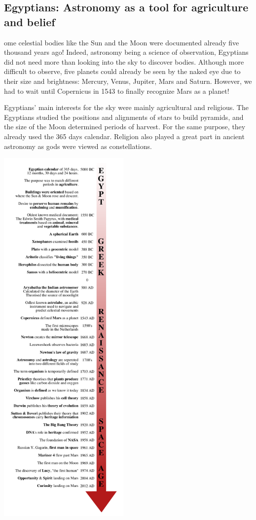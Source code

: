\subsection{Egyptians: Astronomy as a tool for agriculture and belief}
ome celestial bodies like the Sun and the Moon were documented already five thousand years ago!
Indeed, astronomy being a science of observation, Egyptians did not need more than looking into the sky to discover bodies.
Although more difficult to observe, five planets could already be seen by the naked eye due to their size and brightness:
Mercury, Venus, Jupiter, Mars and Saturn.
However, we had to wait until Copernicus in 1543 to finally recognize Mars as a planet!

Egyptians' main interests for the sky were mainly agricultural and religious.
The Egyptians studied the positions and alignments of stars to build pyramids, and the size of the Moon determined periods of harvest.
For the same purpose, they already used the 365 days calendar.
Religion also played a great part in ancient astronomy as gods were viewed as constellations.
\cite{Egyptians}

\begin{center}
	\includegraphics[width=0.48\textwidth]{timeline.pdf}
\end{center}

